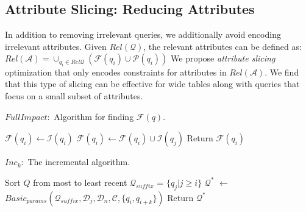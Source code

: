 \subsection{Attribute Slicing: Reducing Attributes}\label{sec:opt:attslice}

In addition to removing irrelevant queries, we additionally avoid encoding irrelevant attributes.
Given $Rel\mathcal{(Q)}$, the relevant attributes can be defined as:
$Rel\mathcal{(A)} = \cup_{q_i \in Rel\mathcal{Q}} (\mathcal{F}(q_i)\cup \mathcal{P}(q_i))$
We propose \emph{attribute slicing} optimization that only encodes constraints for attributes in $Rel\mathcal{(A)}$.
We find that this type of slicing can be effective for wide tables along with queries that focus on a small subset of attributes.  



\begin{algorithm}[t]
\scriptsize
\caption{$FullImpact:$ Algorithm for finding $\mathcal{F}(q)$.}
\label{alg:fullimpact}
\begin{algorithmic}[2]
\STATE $\mathcal{F}(q_i) \leftarrow \mathcal{I}(q_i)$
\STATE $\mathcal{F}(q_i) \leftarrow \mathcal{F}(q_i) \cup \mathcal{I}(q_j)$
\ENDIF
\ENDFOR
\STATE Return $\mathcal{F}(q_i)$
\end{algorithmic}
\end{algorithm}

\begin{algorithm}[t]
\caption{$Inc_k:$ The incremental algorithm. 
}
\scriptsize
\label{alg:incalg}
\begin{algorithmic}[2]
\STATE Sort $Q$ from most to least recent
  \STATE $\mathcal{Q}_{suffix}$ = $\{q_j | j \ge i \}$ 
  \STATE $\mathcal{Q}^*$ $\leftarrow$ $Basic_{params}(\mathcal{Q}_{suffix}, \mathcal{D}_j, \mathcal{D}_n, \mathcal{C}, \{q_i, q_{i+k}\})$
    \STATE Return $\mathcal{Q}^*$
  \ENDIF
\ENDFOR
\end{algorithmic}
\end{algorithm}

